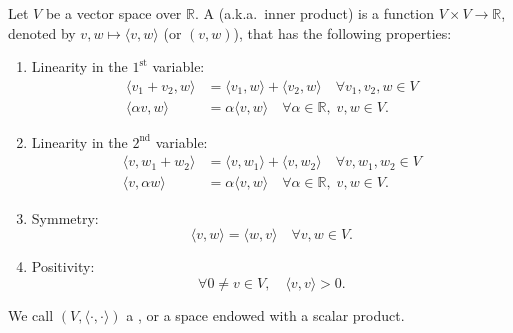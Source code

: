 \begin{definition}
\label{def:scalar_product_real}
Let $V$ be a vector space over $\mathbb{R}$. A  (a.k.a.\ inner product) is a function $V \times V \longrightarrow \mathbb{R}$, denoted by $v, w \mapsto \langle v, w \rangle$ (or $(v,w)$), that has the following properties:
\begin{enumerate}[label=\textbf{(\alph*)}]
    \item Linearity in the $1^{\text{st}}$ variable:
    \begin{align*}
        \langle v_1 + v_2, w \rangle &= \langle v_1, w \rangle + \langle v_2, w \rangle \quad \forall v_1, v_2, w \in V \\
        \langle \alpha v, w \rangle &= \alpha \langle v, w \rangle \quad \forall \alpha \in \mathbb{R}, \; v, w \in V.
    \end{align*}
    \item Linearity in the $2^{\text{nd}}$ variable:
    \begin{align*}
        \langle v, w_1 + w_2 \rangle &= \langle v, w_1 \rangle + \langle v, w_2 \rangle \quad \forall v, w_1, w_2 \in V \\
        \langle v, \alpha w \rangle &= \alpha \langle v, w \rangle \quad \forall \alpha \in \mathbb{R}, \; v, w \in V.
    \end{align*}
    \item Symmetry:
    \[
        \langle v, w \rangle = \langle w, v \rangle \quad \forall v, w \in V.
    \]
    \item Positivity:
    \[
        \forall 0 \neq v \in V, \quad \langle v, v \rangle > 0.
    \]
\end{enumerate}
We call $(V, \langle \cdot, \cdot \rangle)$ a , or a space endowed with a scalar product.
\end{definition}

